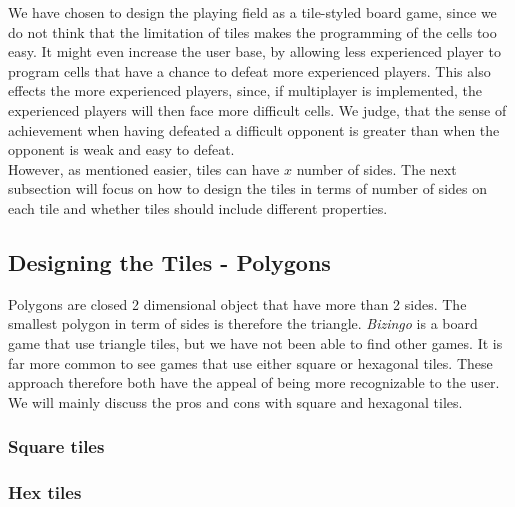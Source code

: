 We have chosen to design the playing field as a tile-styled board game, since we do not think that the limitation of tiles makes the programming of the cells too easy. It might even increase the user base, by allowing less experienced player to program cells that have a chance to defeat more experienced players. This also effects the more experienced players, since, if multiplayer is implemented, the experienced players will then face more difficult cells. We judge, that the sense of achievement when having defeated a difficult opponent is greater than when the opponent is weak and easy to defeat.\\

However, as mentioned easier, tiles can have $x$ number of sides. The next subsection will focus on how to design the tiles in terms of number of sides on each tile and whether tiles should include different properties.

\subsection{Designing the Tiles - Polygons}

Polygons are closed 2 dimensional object that have more than 2 sides. The smallest polygon in term of sides is therefore the triangle. \textit{Bizingo} is a board game that use triangle tiles, but we have not been able to find other games. It is far more common to see games that use either square or hexagonal tiles. These approach therefore both have the appeal of being more recognizable to the user. We will mainly discuss the pros and cons with square and hexagonal tiles.

\subsubsection{Square tiles}



\subsubsection{Hex tiles}


